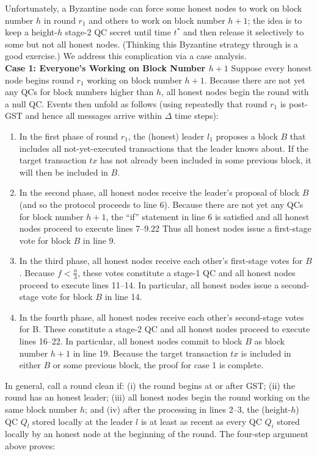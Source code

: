 Unfortunately, a Byzantine node can force some honest nodes to work on
block number $h$ in round $r_1$ and others to work on block number $h + 1$; the idea is to keep
a height-$h$ stage-2 QC secret until time $t^*$ and then release it selectively to some but not all
honest nodes. (Thinking this Byzantine strategy through is a good exercise.) We address
this complication via a case analysis.\\

\noindent\textbf{Case 1: Everyone’s Working on Block Number $h + 1$}
Suppose every honest node begins round $r_1$ working on block number $h + 1$. Because there
are not yet any QCs for block numbers higher than $h$, all honest nodes begin the round with a null QC. Events then unfold as follows (using repeatedly that round $r_1$ is post-GST and
hence all messages arrive within $\Delta$ time steps):
\begin{enumerate}
    \item In the first phase of round $r_1$, the (honest) leader $l_1$ proposes a block $B$ that includes all
not-yet-executed transactions that the leader knows about. If the target transaction $tx$
has not already been included in some previous block, it will then be included in $B$.
    \item In the second phase, all honest nodes receive the leader’s proposal of block $B$ (and
so the protocol proceeds to line 6). Because there are not yet any QCs for block
number $h + 1$, the “if” statement in line 6 is satisfied and all honest nodes proceed to
execute lines 7–9.22 Thus all honest nodes issue a first-stage vote for block $B$ in line 9.
    \item In the third phase, all honest nodes receive each other’s first-stage votes for $B$. Because $f < \frac{n}{3}$, these votes constitute a stage-1 QC and all honest nodes proceed to execute lines 11–14. In particular, all honest nodes issue a second-stage vote for block $B$ in line 14.
    \item In the fourth phase, all honest nodes receive each other’s second-stage votes for B.
    These constitute a stage-2 QC and all honest nodes proceed to execute lines 16–22.
    In particular, all honest nodes commit to block $B$ as block number $h + 1$ in line 19.
    Because the target transaction $tx$ is included in either $B$ or some previous block, the
    proof for case 1 is complete.
\end{enumerate}

In general, call a round clean if: (i) the round begins at or after GST; (ii) the round has an
honest leader; (iii) all honest nodes begin the round working on the same block number $h$;
and (iv) after the processing in lines 2–3, the (height-$h$) QC $Q_l$ stored locally at the leader $l$
is at least as recent as every QC $Q_i$ stored locally by an honest node at the beginning of the
round. The four-step argument above proves:

